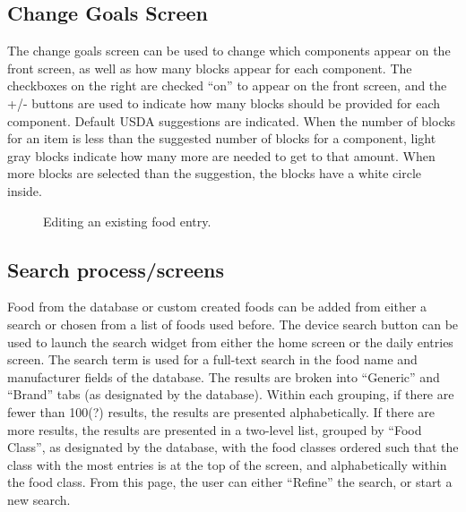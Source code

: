 \subsection{Change Goals Screen}
The change goals screen can be used to change which components appear on the front screen, as well as how many blocks appear for each component. The checkboxes on the right are checked ``on'' to appear on the front screen, and the +/- buttons are used to indicate how many blocks should be provided for each component. Default USDA suggestions are indicated. When the number of blocks for an item is less than the suggested number of blocks for a component, light gray blocks indicate how many more are needed to get to that amount. When more blocks are selected than the suggestion, the blocks have a white circle inside. 


\begin{figure}[ t ]
\centering
\setlength\fboxsep{0pt}
\setlength\fboxrule{0.5pt}
\label{fig:pond_record_edit}

\caption{Editing an existing food entry. }
\end{figure}

\subsection{Search process/screens}
Food from the database or custom created foods can be added from either a search or chosen from a list of foods used before. The device search button can be used to launch the search widget from either the home screen or the daily entries screen. The search term is used for a full-text search in the food name and manufacturer fields of the database. The results are broken into ``Generic'' and ``Brand'' tabs (as designated by the database). Within each grouping, if there are fewer than 100(?) results, the results are presented alphabetically. If there are more results, the results are presented in a two-level list, grouped by ``Food Class'', as designated by the database, with the food classes ordered such that the class with the most entries is at the top of the screen, and alphabetically within the food class. From this page, the user can either ``Refine'' the search, or start a new search. 

